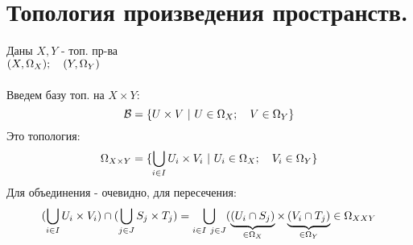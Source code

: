 \documentclass[geometry.tex]{subfiles}
\begin{document}
  \section{Топология произведения пространств.}

  \begin{example} [- конструкция]
      Даны $X, Y$ - топ. пр-ва\\
      $(X, \Omega_X); \q (Y, \Omega_Y)$ \\ \ \\
      Введем базу топ. на $X \times Y$:\\
      \[\B = \{U \times V \ |\ U \in \Omega_X; \q V \in \Omega_Y\}\]
      Это топология:
      \[\Omega_{X \times Y} = \{\bigcup_{i \in I} U_i \times V_i \ | \ U_i \in \Omega_X; \q V_i \in \Omega_Y\}\]
      Для объединения - очевидно, для пересечения:
      \[(\bigcup_{i \in I} U_i \times V_i) \cap (\bigcup_{j \in J} S_j \times T_j) =
      \bigcup_{i \in I \  j  \in J}
      (
          \ub{\in \Omega_X}{(U_i \cap S_j)}
          \times
          \ub{\in \Omega_Y}{(V_i \cap T_j
      )} \in \Omega_{XXY}\]
  \end{example}
\end{document}
